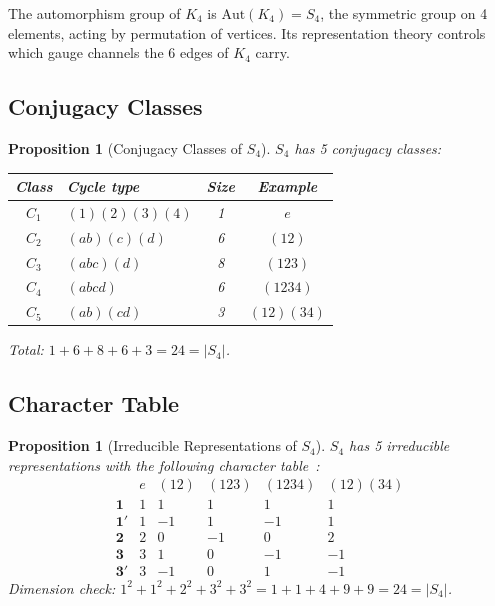 \documentclass[11pt,a4paper]{article}
\newtheorem{proposition}[theorem]{Proposition}
\theoremstyle{definition}
\begin{document}
The automorphism group of $K_4$ is $\mathrm{Aut}(K_4) = S_4$, the symmetric group on 4 elements, acting by permutation of vertices. Its representation theory controls which gauge channels the 6 edges of $K_4$ carry.

\subsection{Conjugacy Classes}

\begin{proposition}[Conjugacy Classes of $S_4$]
\label{S1:prop:conjugacy}
$S_4$ has 5 conjugacy classes:
\begin{center}
\begin{tabular}{clcc}
\toprule
\textbf{Class} & \textbf{Cycle type} & \textbf{Size} & \textbf{Example} \\
\midrule
$C_1$ & $(1)(2)(3)(4)$ & 1 & $e$ \\
$C_2$ & $(ab)(c)(d)$ & 6 & $(12)$ \\
$C_3$ & $(abc)(d)$ & 8 & $(123)$ \\
$C_4$ & $(abcd)$ & 6 & $(1234)$ \\
$C_5$ & $(ab)(cd)$ & 3 & $(12)(34)$ \\
\bottomrule
\end{tabular}
\end{center}
Total: $1 + 6 + 8 + 6 + 3 = 24 = |S_4|$.
\end{proposition}

\subsection{Character Table}

\begin{proposition}[Irreducible Representations of $S_4$]
\label{S1:prop:character_table}
$S_4$ has 5 irreducible representations with the following character table~\cite{Serre1977}:
\begin{equation}
\begin{array}{c|ccccc}
 & e & (12) & (123) & (1234) & (12)(34) \\\hline
\mathbf{1}  & 1 & 1  & 1  & 1  & 1 \\
\mathbf{1'} & 1  & -1 & 1  & -1 & 1 \\
\mathbf{2}  & 2 & 0  & -1 & 0  & 2 \\
\mathbf{3}  & 3 & 1  & 0  & -1 & -1 \\
\mathbf{3'} & 3 & -1 & 0  & 1  & -1
\end{array}
\label{S1:eq:character_table}
\end{equation}
Dimension check: $1^2 + 1^2 + 2^2 + 3^2 + 3^2 = 1 + 1 + 4 + 9 + 9 = 24 = |S_4|$.
\end{proposition}
\end{document}
